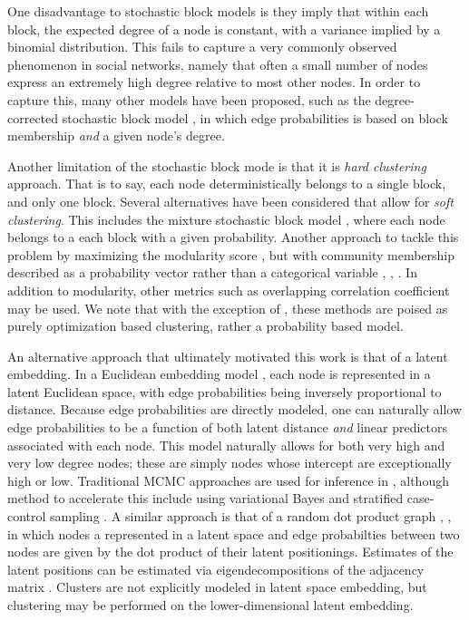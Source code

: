 \documentclass[11pt]{amsart}
\begin{document}
One disadvantage to stochastic block models is they imply that within each block, 
the expected degree of a node is constant, with a variance implied by a binomial distribution. 
This fails to capture a very commonly observed phenomenon in social networks,
namely that often a small number of nodes express an extremely high degree relative to most other nodes. 
In order to capture this, many other models have been proposed, such as the degree-corrected stochastic 
block model \cite{dcsbm}, in which edge probabilities is based on block membership
 \emph{and} a given node's degree. 

Another limitation of the stochastic block mode is that it is \emph{hard clustering} approach. 
That is to say, each node deterministically belongs to a single block, and only one block. 
Several alternatives have been considered that allow for \emph{soft clustering}. 
This includes the mixture stochastic block model \cite{msbm}, where each node belongs to a each block 
with a given probability. Another approach to tackle this problem 
by maximizing the modularity score \cite{modularity}, but with community membership 
described as a probability vector rather than a categorical variable \cite{softmod1}, \cite{softmod2}, \cite{softmod3}.
In addition to modularity, other metrics such as overlapping correlation coefficient \cite{occ} may be used. 
We note that with the exception of \cite{msbm}, these methods are 
poised as purely optimization based clustering, rather 
a probability based model.

An alternative approach that ultimately motivated this work is that of 
a latent embedding. In a Euclidean embedding model \cite{eucEmbed}, 
each node is represented in a latent Euclidean space, 
with edge probabilities being inversely proportional to distance.
Because edge probabilities are directly modeled, one can naturally 
allow edge probabilities to be a function of both latent distance
\emph{and} linear predictors associated with each node. 
This model naturally allows for both very high and very low degree
nodes; these are simply nodes whose intercept are exceptionally high or low. 
Traditional MCMC approaches are used for inference in \cite{eucEmbed}, 
although method to accelerate this include using variational Bayes \cite{vbEuc}
and stratified case-control sampling \cite{stratEuc}.
A similar approach is that of a random dot product graph \cite{randDot1}, \cite{randDot2},
in which nodes a represented in a latent space and edge probabilties
between two nodes are given by the dot product of their latent positionings. 
Estimates of the latent positions can be estimated via eigendecompositions of
the adjacency matrix \cite{eigenDot}. Clusters are not explicitly 
modeled in latent space embedding, but clustering may be performed 
on the lower-dimensional latent embedding. 
\end{document}
